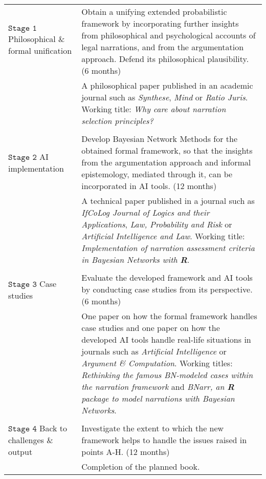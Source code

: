 \documentclass[11pt,dvipsnames,enabledeprecatedfontcommands]{scrartcl}
\begin{document}
\vspace{1mm}

\begin{center}
\begin{tabular}{p{2.3cm}|p{13.8cm}}
\footnotesize \textbf{$\mathtt{Stage  \,\, 1}$} \newline  \tiny Philosophical \&  formal \newline  unification & 
Obtain a unifying extended  probabilistic framework by incorporating further insights  from philosophical and psychological accounts of legal narrations, and from the argumentation approach. Defend its philosophical plausibility. \scriptsize (6 months)
\\ 
& \footnotesize A philosophical paper published in an  academic journal such as \emph{Synthese}, \emph{Mind} or \emph{Ratio Juris}. Working title: \emph{Why care about narration selection principles?}\\ \\
\footnotesize \textbf{$\mathtt{Stage \,\, 2}$} \newline  \tiny AI implementation 
 & Develop Bayesian Network Methods for the obtained formal framework, so that the insights from the argumentation approach and informal epistemology, mediated through it, can be incorporated in AI tools. \scriptsize (12 months)
\\ & \footnotesize A   technical paper  published in a journal such as \emph{IfCoLog Journal of Logics and their Applications}, \emph{Law, Probability and Risk} or \emph{Artificial Intelligence and Law}. Working title: \emph{Implementation of narration assessment criteria in Bayesian Networks with \textbf{\textsf{R}}}.
\\ \\
\footnotesize \textbf{$\mathtt{Stage  \,\, 3}$} \newline  \tiny    Case studies & 
Evaluate the developed framework and AI tools  by conducting case studies from its perspective.    \scriptsize (6 months)  \\
& \footnotesize One paper  on  how the formal framework handles case studies and  one paper  on how the developed AI tools handle real-life situations in   journals such as \emph{Artificial Intelligence} or \emph{Argument \& Computation}. Working titles: \emph{Rethinking the famous BN-modeled cases within the narration framework} and \emph{BNarr, an \textbf{\textsf{R}} package to model narrations with Bayesian Networks}.
\\ \\
\footnotesize \textbf{$\mathtt{Stage  \,\, 4}$} \newline  \tiny    Back to challenges \& output & 
Investigate the extent to which the new framework helps to handle the issues raised in points A-H. \scriptsize (12 months) \\ 
& \footnotesize Completion of the planned book.
\end{tabular}
\end{center}
\end{document}
